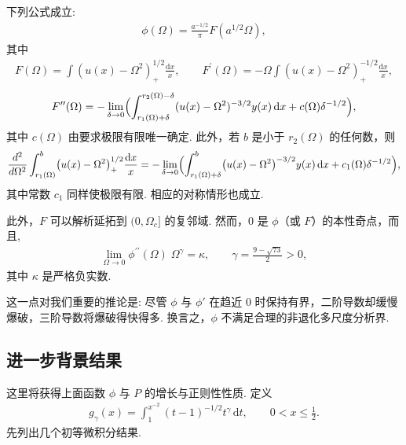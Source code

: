 \begin{lemma}\label{lem:9.11}
下列公式成立:
\begin{align*}
  \phi(\Omega)=\frac{a^{-1/2}}{\pi}F(a^{1/2}\Omega),
\end{align*}
其中
\begin{align*}
  F(\Omega)=\int\left(u(x)-\Omega^{2}\right)_{+}^{1/2}\frac{\mathrm{d}x}{x},
  \qquad
  F^{\prime}(\Omega)=-\Omega\int\left(u(x)-\Omega^{2}\right)_{+}^{-1/2}\frac{\mathrm{d}x}{x},
\end{align*}
\begin{align*}
  F^{\prime\prime}(\Omega)=-\lim_{\delta\rightarrow 0}\Bigl(\int_{r_{1}(\Omega)+\delta}^{r_{2}(\Omega)-\delta}
  (u(x)-\Omega^{2})^{-3/2}y(x)\,\mathrm{d}x+c(\Omega)\delta^{-1/2}\Bigr),
\end{align*}
其中 $c(\Omega)$ 由要求极限有限唯一确定. 此外，若 $b$ 是小于 $r_{2}(\Omega)$ 的任何数，则
\begin{align*}
  \frac{d^{2}}{d\Omega^{2}}\int_{r_{1}(\Omega)}^{b}\bigl(u(x)-\Omega^{2}\bigr)_{+}^{1/2}\frac{\mathrm{d}x}{x}
  =-\lim_{\delta\to 0}\Bigl(\int_{r_{1}(\Omega)+\delta}^{b}
  \bigl(u(x)-\Omega^{2}\bigr)^{-3/2}y(x)\,\mathrm{d}x+c_{1}(\Omega)\delta^{-1/2}\Bigr),
\end{align*}
其中常数 $c_{1}$ 同样使极限有限. 相应的对称情形也成立.

此外，$F$ 可以解析延拓到 $(0, \Omega_c]$ 的复邻域. 然而，$0$ 是 $\phi$（或 $F$）的本性奇点，而且,
\begin{align*}
  \lim_{\Omega\to 0}\phi^{\prime\prime}(\Omega)\;\Omega^{\gamma}=\kappa,
  \qquad \gamma=\frac{9-\sqrt{73}}{2}>0,
\end{align*}
其中 $\kappa$ 是严格负实数.

这一点对我们重要的推论是: 尽管 $\phi$ 与 $\phi'$ 在趋近 $0$ 时保持有界，二阶导数却缓慢爆破，三阶导数将爆破得快得多. 换言之，$\phi$ 不满足合理的非退化多尺度分析界.
\end{lemma}

\subsection{进一步背景结果}

这里将获得上面函数 $\phi$ 与 $P$ 的增长与正则性性质. 定义
\begin{align*}
  g_{\gamma}(x)=\int_{1}^{x^{-2}}(t-1)^{-1/2}t^{\gamma}\,\mathrm{d}t,\qquad 0<x\leq\frac{1}{2}.
\end{align*}
先列出几个初等微积分结果.

